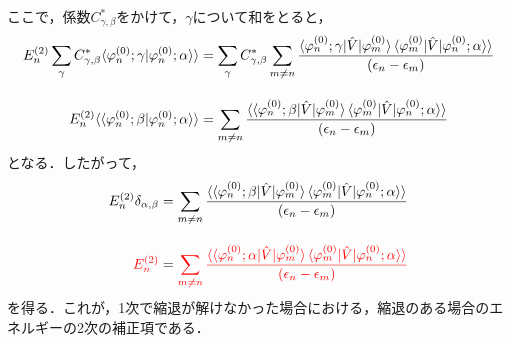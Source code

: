 ここで，係数$C_{\gamma,\beta}^{\ast}$をかけて，$\gamma$について和をとると，
\begin{align}
    E^{(2)}_n
    \sum_{\gamma}C_{\gamma,\beta}^{\ast}\langle \varphi^{(0)}_n;\gamma|\varphi^{(0)}_n;\alpha\rangle\rangle
    &=\sum_{\gamma}C_{\gamma,\beta}^{\ast}
    \sum_{m\neq n}\frac{\langle{\varphi^{(0)}_n;\gamma|\hat{V}|\varphi^{(0)}_m}\rangle
    \braket{\varphi^{(0)}_{m}|\hat{V}|\varphi^{(0)}_n;\alpha}\rangle}{(\epsilon_n-\epsilon_m)}\nn[10pt]
    E^{(2)}_n
    \langle\langle \varphi^{(0)}_n;\beta|\varphi^{(0)}_n;\alpha\rangle\rangle
    &=\sum_{m\neq n}\frac{\langle\langle{\varphi^{(0)}_n;\beta|\hat{V}|\varphi^{(0)}_m}\rangle
    \braket{\varphi^{(0)}_{m}|\hat{V}|\varphi^{(0)}_n;\alpha}\rangle}{(\epsilon_n-\epsilon_m)}
\end{align}
となる．したがって，
\begin{align}
    E^{(2)}_n\delta_{\alpha,\beta}
    &=\sum_{m\neq n}\frac{\langle\langle{\varphi^{(0)}_n;\beta|\hat{V}|\varphi^{(0)}_m}\rangle
    \braket{\varphi^{(0)}_{m}|\hat{V}|\varphi^{(0)}_n;\alpha}\rangle}{(\epsilon_n-\epsilon_m)}\\[10pt]
    \textcolor{red}{
    E^{(2)}_n}
    &=\textcolor{red}{\sum_{m\neq n}\frac{\langle\langle{\varphi^{(0)}_n;\alpha|\hat{V}|\varphi^{(0)}_m}\rangle
    \braket{\varphi^{(0)}_{m}|\hat{V}|\varphi^{(0)}_n;\alpha}\rangle}{(\epsilon_n-\epsilon_m)}}
\end{align}
を得る．これが，1次で縮退が解けなかった場合における，縮退のある場合のエネルギーの2次の補正項である．



